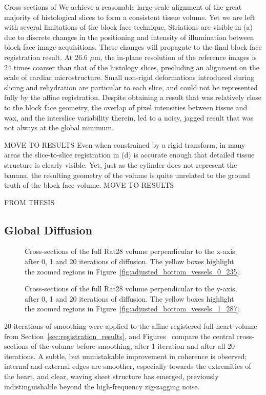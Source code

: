   Cross-sections of We achieve a reasonable large-scale alignment of the great majority of histological slices to form a consistent tissue volume. Yet we are left with several limitations of the block face technique. Striations are visible in (a) due to discrete changes in the positioning and intensity of illumination between block face image acquisitions. These changes will propagate to the final block face registration result. At 26.6 $\mu$m, the in-plane resolution of the reference images is 24 times coarser than that of the histology slices, precluding an alignment on the scale of cardiac microstructure. Small non-rigid deformations introduced during slicing and rehydration are particular to each slice, and could not be represented fully by the affine registration. Despite obtaining a result that was relatively close to the block face geometry, the overlap of pixel intensities between tissue and wax, and the interslice variability therein, led to a noisy, jagged result that was not always at the global minimum.
  
  MOVE TO RESULTS Even when constrained by a rigid transform, in many areas the slice-to-slice registration in (d) is accurate enough that detailed tissue structure is clearly visible. Yet, just as the cylinder does not represent the banana, the resulting geometry of the volume is quite unrelated to the ground truth of the block face volume. MOVE TO RESULTS
  
  FROM THESIS
  
  \subsection{Global Diffusion} %
  \label{sub:global_diffusion}
    \begin{figure}[htbp]
      \caption{Cross-sections of the full Rat28 volume perpendicular to the x-axis, after 0, 1 and 20 iterations of diffusion. The yellow boxes highlight the zoomed regions in Figure~\ref{fig:adjusted_bottom_vessels_0_235}.}
    \end{figure}

    \begin{figure}[htbp]
      \caption{Cross-sections of the full Rat28 volume perpendicular to the y-axis, after 0, 1 and 20 iterations of diffusion. The yellow boxes highlight the zoomed regions in Figure~\ref{fig:adjusted_bottom_vessels_1_287}.}
    \end{figure}
    
    20 iterations of smoothing were applied to the affine registered full-heart volume from Section~\ref{sec:registration_results}, and Figures~ compare the central cross-sections of the volume before smoothing, after 1 iteration and after all 20 iterations. A subtle, but unmistakable improvement in coherence is observed; internal and external edges are smoother, especially towards the extremities of the heart, and clear, waving sheet structure has emerged, previously indistinguishable beyond the high-frequency zig-zagging noise.
    
